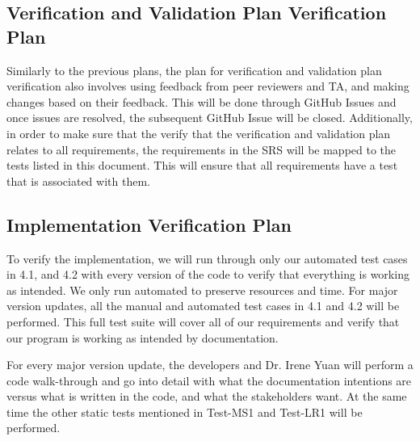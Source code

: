 \documentclass[12pt, titlepage]{article}
\begin{document}
\subsection{Verification and Validation Plan Verification Plan}



Similarly to the previous plans, the plan for verification and validation plan verification also involves using feedback from peer reviewers and TA, and making changes based on their feedback. This will be done through GitHub Issues and once issues are resolved, the subsequent GitHub Issue will be closed. Additionally, in order to make sure that the verify that the verification and validation plan relates to all requirements, the requirements in the SRS will be mapped to the tests listed in this document. This will ensure that all requirements have a test that is associated with them.

\subsection{Implementation Verification Plan}

To verify the implementation, we will run through only our automated test cases in 4.1, and 4.2 with every version of the code to verify that everything is working as intended. We only run automated to preserve resources and time. For major version updates, all the manual and automated test cases in 4.1 and 4.2 will be performed. This full test suite will cover all of our requirements and verify that our program is working as intended by documentation. 

For every major version update, the developers and Dr. Irene Yuan will perform a code walk-through and go into detail with what the documentation intentions are versus what is written in the code, and what the stakeholders want. At the same time the other static tests mentioned in Test-MS1 and Test-LR1 will be performed.

\end{document}
